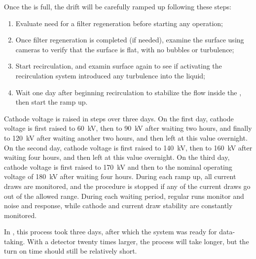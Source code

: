 Once the  is full, the drift  will be carefully ramped up following these steps:

\begin{enumerate}

    \item %
    Evaluate need for a filter regeneration before starting any operation;

    \item Once filter regeneration is completed (if needed), examine the  surface %
    using cameras to verify that the surface is flat, with no bubbles or turbulence;
    
    \item Start  recirculation, %
    and examin  surface %
    again to see if activating the recirculation system introduced any turbulence into the liquid;
    
    \item Wait one day after beginning  recirculation to stabilize the  flow inside the , then start the  ramp up.
    
\end{enumerate}

Cathode voltage is raised in steps over three days. 
On the first day, cathode voltage is first raised to \SI{60}{kV}, then to \SI{90}{kV} after waiting two hours, and finally to \SI{120}{kV} after waiting another two hours, and then left at this value overnight.
On the second day, cathode voltage is first raised to \SI{140}{kV}, then to \SI{160}{kV} after waiting four hours, and then left at this value overnight. 
On the third day, cathode voltage is first raised to \SI{170}{kV} and then to the nominal operating voltage of \SI{180}{kV} after waiting four hours. 
During each  ramp up, all  current draws are monitored, and the procedure is stopped if any of the current draws go out of the allowed range. 
During each waiting period, regular  runs monitor  and  noise and response, while cathode  and current draw stability are constantly monitored.

In , this process took three days, after which the system was  ready for data-taking. With a detector twenty times larger, the process will take longer, but the turn on time should still be relatively short. 










